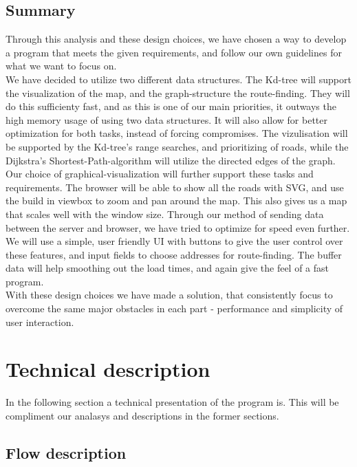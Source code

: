 \documentclass[a4paper,10pt,titlepage]{article}
\begin{document}
		\subsection{Summary}
Through this analysis and these design choices, we have chosen a way to develop a program that meets the given requirements, and follow our own guidelines for what we want to focus on.\\
We have decided to utilize two different data structures. The Kd-tree will support the visualization of the map, and the graph-structure the route-finding. They will do this sufficienty fast, and as this is one of our main priorities, it outways the high memory usage of using two data structures. It will also allow for better optimization for both tasks, instead of forcing compromises. The vizulisation will be supported by the Kd-tree's range searches, and prioritizing of roads, while the Dijkstra's Shortest-Path-algorithm will utilize the directed edges of the graph.\\
Our choice of graphical-visualization will further support these tasks and requirements. The browser will be able to show all the roads with SVG, and use the build in viewbox to zoom and pan around the map. This also gives us a map that scales well with the window size. Through our method of sending data between the server and browser, we have tried to optimize for speed even further.\\
We will use a simple, user friendly UI with buttons to give the user control over these features, and input fields to choose addresses for route-finding. The buffer data will help smoothing out the load times, and again give the feel of a fast program.\\
With these design choices we have made a solution, that consistently focus to overcome the same major obstacles in each part - performance and simplicity of user interaction.
			
	\newpage		
	\section{Technical description}
		In the following section a technical presentation of the program is. This will be compliment our analasys and descriptions in the former sections.  
		
		\subsection{Flow description}
\end{document}
